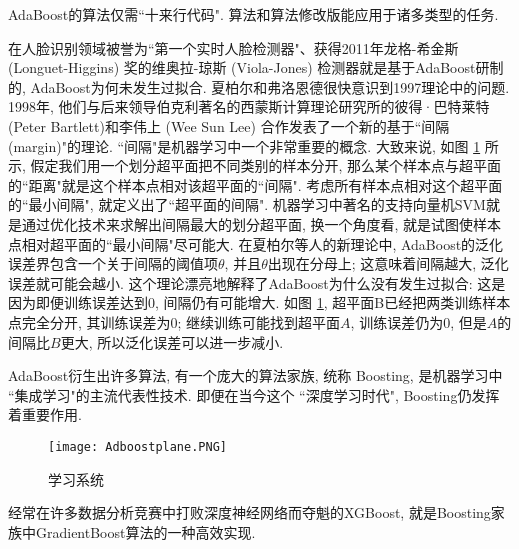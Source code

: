 AdaBoost的算法仅需“十来行代码". 算法和算法修改版能应用于诸多类型的任务.
\begin{example}
在人脸识别领域被誉为“第一个实时人脸检测器"、获得2011年龙格-希金斯 (Longuet-Higgins) 奖的维奥拉-琼斯 (Viola-Jones) 检测器就是基于AdaBoost研制的, AdaBoost为何未发生过拟合. 
夏柏尔和弗洛恩德很快意识到1997理论中的问题. 1998年, 他们与后来领导伯克利著名的西蒙斯计算理论研究所的彼得·巴特莱特 (Peter Bartlett)和李伟上 (Wee Sun Lee) 合作发表了一个新的基于“间隔 (margin)"的理论.
“间隔"是机器学习中一个非常重要的概念. 大致来说, 如图 \ref{AI32Adboostplane} 所示, 假定我们用一个划分超平面把不同类别的样本分开, 那么某个样本点与超平面的“距离"就是这个样本点相对该超平面的“间隔".
考虑所有样本点相对这个超平面的“最小间隔", 就定义出了“超平面的间隔".
机器学习中著名的支持向量机SVM就是通过优化技术来求解出间隔最大的划分超平面, 换一个角度看, 就是试图使样本点相对超平面的“最小间隔"尽可能大.
在夏柏尔等人的新理论中, AdaBoost的泛化误差界包含一个关于间隔的阈值项$\theta$, 并且$\theta$出现在分母上; 这意味着间隔越大, 泛化误差就可能会越小.
这个理论漂亮地解释了AdaBoost为什么没有发生过拟合:
这是因为即便训练误差达到0, 间隔仍有可能增大. 如图 \ref{AI32Adboostplane}, 超平面B已经把两类训练样本点完全分开, 其训练误差为0;
继续训练可能找到超平面$A$, 训练误差仍为0, 但是$A$的间隔比$B$更大, 所以泛化误差可以进一步减小.

AdaBoost衍生出许多算法, 有一个庞大的算法家族, 统称 Boosting, 是机器学习中 ``集成学习"的主流代表性技术.
即便在当今这个 ``深度学习时代", Boosting仍发挥着重要作用. 
\begin{figure}[H]
    \begin{center}
    \texttt{[image: Adboostplane.PNG]}
    \end{center}
    \vspace{-0.2cm}
    \caption{学习系统}
    \label{AI32Adboostplane}
\end{figure}
\vspace{-0.8cm}
\end{example}
\begin{example}
    经常在许多数据分析竞赛中打败深度神经网络而夺魁的XGBoost, 就是Boosting家族中GradientBoost算法的一种高效实现. 
\end{example}

